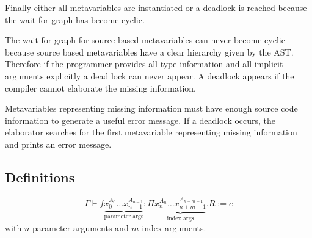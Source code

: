 Finally either all metavariables are instantiated or a deadlock is reached
because the wait-for graph has become cyclic.

The wait-for graph for source based metavariables can never become cyclic
because source based metavariables have a clear hierarchy given by the AST.
Therefore if the programmer provides all type information and all implicit
arguments explicitly a dead lock can never
appear. A deadlock appears if the compiler cannot elaborate the missing
information.

Metavariables representing missing information must have enough source code
information to generate a useful error message. If a deadlock occurs, the
elaborator searches for the first metavariable representing missing
information and prints an error message.






\subsection{Definitions}

$$
\Gamma
\vdash
f
    \underbrace{
        x_0^{A_0} \ldots x_{n-1}^{A_{n-1}}
        }_{\text{parameter args}}
    :
    \Pi
        \underbrace{
            x_n^{A_n} \ldots x_{n+m-1}^{A_{n+m-1}}
        }_{\text{index args}}
    .
    R
    := e
$$
with $n$ parameter arguments and $m$ index arguments.



